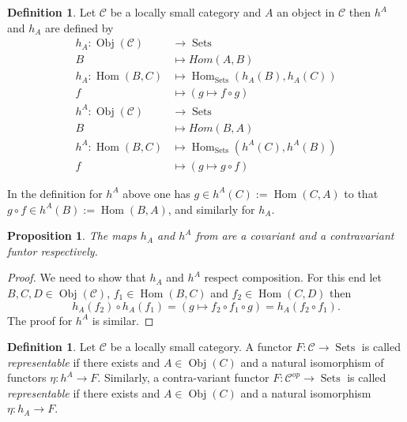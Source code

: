 \documentclass[a4paper,12pt,reqno]{amsart}
\DeclareMathOperator{\Sets}{Sets}
\DeclareMathOperator{\Hom}{Hom}
\DeclareMathOperator{\Obj}{Obj}
\newtheorem{proposition}[lemma]{Proposition}
\theoremstyle{definition}
\newtheorem{definition}[lemma]{Definition}
\numberwithin{lemma}{section}
\numberwithin{equation}{section}
\numberwithin{figure}{section}
\begin{document}
\begin{definition}\label{def:hom-functor}
Let $\mathcal C$ be a locally small category and $A$ an object in  $\mathcal C$ then $h^A$  and $h_A$ are defined by
\begin{align*}
h_A : \Obj(\mathcal C) &\to \Sets \\
B &\mapsto Hom(A,B)  \\
h_A : \Hom(B,C)  & \mapsto \Hom_{\Sets}(h_A(B),h_A(C)) \\
f &\mapsto (g \mapsto f \circ g) \\
h^A : \Obj(\mathcal C) &\to \Sets \\
         B &\mapsto Hom(B,A)  \\
h^A : \Hom(B,C)  & \mapsto \Hom_{\Sets}(h^A(C),h^A(B)) \\
             f &\mapsto (g \mapsto  g \circ f)
\end{align*}

\end{definition}
In the definition for $h^A$ above one has $g \in h^A(C) :=\Hom(C,A)$ to that $g \circ f \in h^A(B) :=\Hom(B,A)$, and similarly for $h_A$.

\begin{proposition}
The maps $h_A$ and $h^A$ from  are a covariant and a contravariant funtor respectively. 
\end{proposition}
\begin{proof}
We need to show that $h_A$ and $h^A$ respect composition. For this end let $B,C,D \in \Obj(\mathcal C)$, $f_1 \in \Hom(B,C)$ and $f_2 \in \Hom(C,D)$ then 
$$h_A(f_2) \circ h_A(f_1) = (g \mapsto f_2 \circ f_1 \circ g) = h_A(f_2 \circ f_1).$$ 
The proof for $h^A$ is similar.
\end{proof}

\begin{definition}\label{def:representable-functor}
Let $\mathcal C$ be a locally small category. A functor $F: \mathcal C \to \Sets$ is called \textit{representable} if there exists and $A \in \Obj(C)$ and a natural isomorphism of functors $\eta: h^A \to F$.  Similarly, a contra-variant functor $F: \mathcal C ^{op} \to \Sets$ is called \textit{representable} if there exists and $A \in \Obj(C)$ and a natural isomorphism $\eta: h_A \to F$.  
\end{definition}
\end{document}
